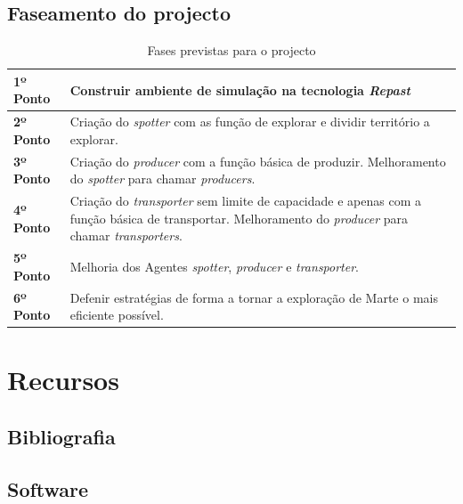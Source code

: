 \documentclass[12pt]{report}
\begin{document}
\newpage
\section{Faseamento do projecto}

\begin{table}[htb]
\centering
\caption{Fases previstas para o projecto}
    \sffamily \begin{tabularx}{1.0\textwidth}{ p{3cm}  p{} }
    \hline
    \textbf{1º Ponto} \hfill & Construir ambiente de simulação na tecnologia \emph{Repast} \\ \hline
    \textbf{2º Ponto} \hfill & Criação do \emph{spotter} com as função de explorar e dividir território a explorar. \\ \hline
    \textbf{3º Ponto} \hfill & Criação do \emph{producer} com a função básica de produzir. Melhoramento do \emph{spotter} para chamar \emph{producers}. \\ \hline
    \textbf{4º Ponto} \hfill & Criação do \emph{transporter} sem limite de capacidade e apenas com a função básica de transportar. Melhoramento do \emph{producer} para chamar \emph{transporters}. \\ \hline
    \textbf{5º Ponto} \hfill & Melhoria dos Agentes \emph{spotter}, \emph{producer} e \emph{transporter}. \\ \hline
    \textbf{6º Ponto} \hfill & Defenir estratégias de forma a tornar a exploração de Marte o mais eficiente possível. \\ \hline
    \end{tabularx} \normalfont
\end{table}

\chapter{Recursos}
\section{Bibliografia}
\section{Software}
\end{document}
